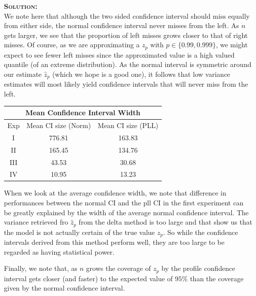 \documentclass[12pt,oneside]{article}
\newenvironment{solution}
    {\textbf{\textsc{Solution:}}\\}
    {\newpage}
\begin{document}
\begin{solution}
We note here that although the two sided confidence interval should miss equally from either side, the normal confidence interval never misses from the left. As $n$ gets larger, we see that the proportion of left misses grows closer to that of right misses. Of course, as we are approximating a $z_p$ with $p\in \{0.99, 0.999\}$, we might expect to see fewer left misses since the approximated value is a high valued quantile (of an extreme distribution). As the normal interval is symmetric around our estimate $\hat{z}_p$ (which we hope is a good one), it follows that low variance estimates will most likely yield confidence intervals that will never miss from the left.  


\begin{center}
    \begin{tabular}{||c|c|c||}\hline
    \multicolumn{3}{||c||}{Mean Confidence Interval Width}\\\hline\hline
     Exp& Mean CI size (Norm) & Mean CI size (PLL) \\\hline
     I&  776.81&163.83   \\\hline
     II&  165.45&134.76  \\\hline
     III&43.53 &30.68 \\\hline
     IV& 10.95& 13.23  \\\hline
\end{tabular}
\end{center}
When we look at the average confidence width, we note that difference in performances between the normal CI and the pll CI in the first experiment can be greatly explained by the width of the average normal confidence interval. The variance retrieved fro $\hat{z}_p$ from the delta method is too large and that show us that the model is not actually certain of the true value $z_p$. So while the confidence intervals derived from this method perform well, they are too large to be regarded as having statistical power.

Finally, we note that, as $n$ grows the coverage of $z_p$ by the profile confidence interval gets closer (and faster) to the expected value of $95\%$ than the coverage given by the normal confidence interval.
\end{solution}
\end{document}
